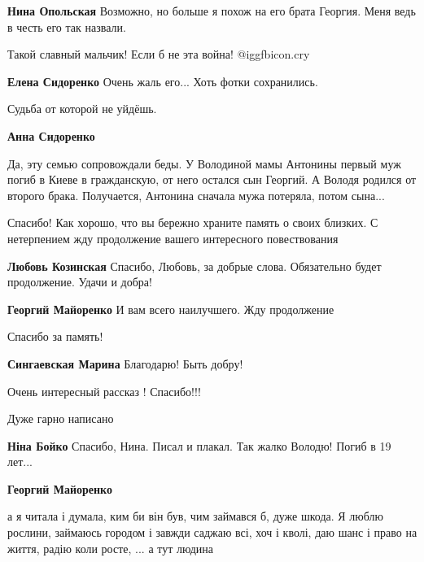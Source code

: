 \begin{itemize}
\begin{itemize}
\textbf{Нина Опольская} Возможно, но больше я похож на его брата Георгия. Меня ведь в честь его так назвали.
\end{itemize} %

Такой славный мальчик! Если б не эта война! @igg{fbicon.cry} 

\textbf{Елена Сидоренко} Очень жаль его... Хоть фотки сохранились.

Судьба от которой не уйдёшь.

\begin{itemize} %
\textbf{Анна Сидоренко} 

Да, эту семью сопровождали беды. У Володиной мамы Антонины первый муж погиб в
Киеве в гражданскую, от него остался сын Георгий. А Володя родился от второго
брака. Получается, Антонина сначала мужа потеряла, потом сына...

\end{itemize} %


Спасибо! Как хорошо, что вы бережно храните память о своих близких. С
нетерпением жду продолжение вашего интересного повествования

\begin{itemize} %
\textbf{Любовь Козинская} Спасибо, Любовь, за добрые слова. Обязательно будет продолжение. Удачи и добра!

\textbf{Георгий Майоренко} И вам всего наилучшего. Жду продолжение
\end{itemize} %

Спасибо за память!

\textbf{Сингаевская Марина} Благодарю! Быть добру!

Очень интересный рассказ ! Спасибо!!!

Дуже гарно написано

\begin{itemize} %
\textbf{Ніна Бойко} Спасибо, Нина. Писал и плакал. Так жалко Володю! Погиб в 19 лет...

\textbf{Георгий Майоренко} 

а я читала і думала, ким би він був, чим займався б, дуже шкода. Я люблю
рослини, займаюсь городом і завжди саджаю всі, хоч і кволі, даю шанс і право на
життя, радію коли росте, ... а тут людина


\end{itemize}
\end{itemize}

